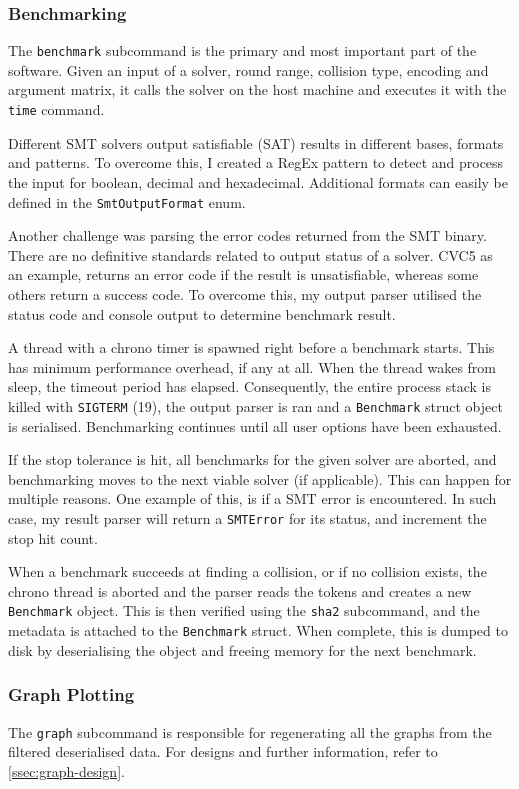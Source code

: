 \documentclass[a4paper]{report}
\begin{document}
\subsubsection{Benchmarking}
\label{sssec:benchmarking}
The \texttt{benchmark} subcommand is the primary and most important part of the software.
Given an input of a solver, round range, collision type, encoding and argument matrix, it calls the solver on the host machine and executes it with the \texttt{time} command.

Different SMT solvers output satisfiable (SAT) results in different bases, formats and patterns.
To overcome this, I created a RegEx pattern to detect and process the input for boolean, decimal and hexadecimal.
Additional formats can easily be defined in the \texttt{SmtOutputFormat} enum.

Another challenge was parsing the error codes returned from the SMT binary.
There are no definitive standards related to output status of a solver.
CVC5 as an example, returns an error code if the result is unsatisfiable, whereas some others return a success code.
To overcome this, my output parser utilised the status code and console output to determine benchmark result.

A thread with a chrono timer is spawned right before a benchmark starts.
This has minimum performance overhead, if any at all.
When the thread wakes from sleep, the timeout period has elapsed.
Consequently, the entire process stack is killed with \texttt{SIGTERM} (19), the output parser is ran and a \texttt{Benchmark} struct object is serialised.
Benchmarking continues until all user options have been exhausted.

If the stop tolerance is hit, all benchmarks for the given solver are aborted, and benchmarking moves to the next viable solver (if applicable).
This can happen for multiple reasons.
One example of this, is if a SMT error is encountered.
In such case, my result parser will return a \texttt{SMTError} for its status, and increment the stop hit count.

When a benchmark succeeds at finding a collision, or if no collision exists, the chrono thread is aborted and the parser reads the tokens and creates a new \texttt{Benchmark} object.
This is then verified using the \texttt{sha2} subcommand, and the metadata is attached to the \texttt{Benchmark} struct.
When complete, this is dumped to disk by deserialising the object and freeing memory for the next benchmark.

\subsubsection{Graph Plotting}
The \texttt{graph} subcommand is responsible for regenerating all the graphs from the filtered deserialised data.
For designs and further information, refer to \ref{ssec:graph-design}.
\end{document}
